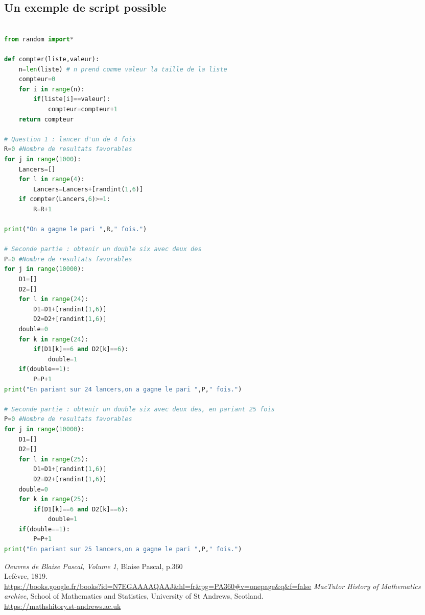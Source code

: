 \documentclass[frenchb]{article}
\begin{document}
\subsection*{Un exemple de script possible}
\begin{lstlisting}[language=Python]

from random import*

def compter(liste,valeur):
    n=len(liste) # n prend comme valeur la taille de la liste
    compteur=0
    for i in range(n):
        if(liste[i]==valeur):
            compteur=compteur+1
    return compteur

# Question 1 : lancer d'un de 4 fois
R=0 #Nombre de resultats favorables
for j in range(1000):
    Lancers=[]
    for l in range(4):
        Lancers=Lancers+[randint(1,6)]
    if compter(Lancers,6)>=1:
        R=R+1

print("On a gagne le pari ",R," fois.")

# Seconde partie : obtenir un double six avec deux des
P=0 #Nombre de resultats favorables
for j in range(10000):
    D1=[]
    D2=[]
    for l in range(24):
        D1=D1+[randint(1,6)]
        D2=D2+[randint(1,6)]
    double=0
    for k in range(24):
        if(D1[k]==6 and D2[k]==6):
            double=1
    if(double==1):
        P=P+1
print("En pariant sur 24 lancers,on a gagne le pari ",P," fois.")

# Seconde partie : obtenir un double six avec deux des, en pariant 25 fois
P=0 #Nombre de resultats favorables
for j in range(10000):
    D1=[]
    D2=[]
    for l in range(25):
        D1=D1+[randint(1,6)]
        D2=D2+[randint(1,6)]
    double=0
    for k in range(25):
        if(D1[k]==6 and D2[k]==6):
            double=1
    if(double==1):
        P=P+1
print("En pariant sur 25 lancers,on a gagne le pari ",P," fois.")
\end{lstlisting}

\begin{thebibliography}{1}
 {\it Oeuvres de Blaise Pascal, Volume 1}, Blaise Pascal, p.360 \\Lefèvre, 1819. \\
\url{https://books.google.fr/books?id=N7EGAAAAQAAJ&hl=fr&pg=PA360#v=onepage&q&f=false}
 {\it MacTutor History of Mathematics archive}, School of Mathematics and Statistics, University of St Andrews, Scotland. \\
\url{https://mathshitory.st-andrews.ac.uk}

\end{thebibliography}
\end{document}
